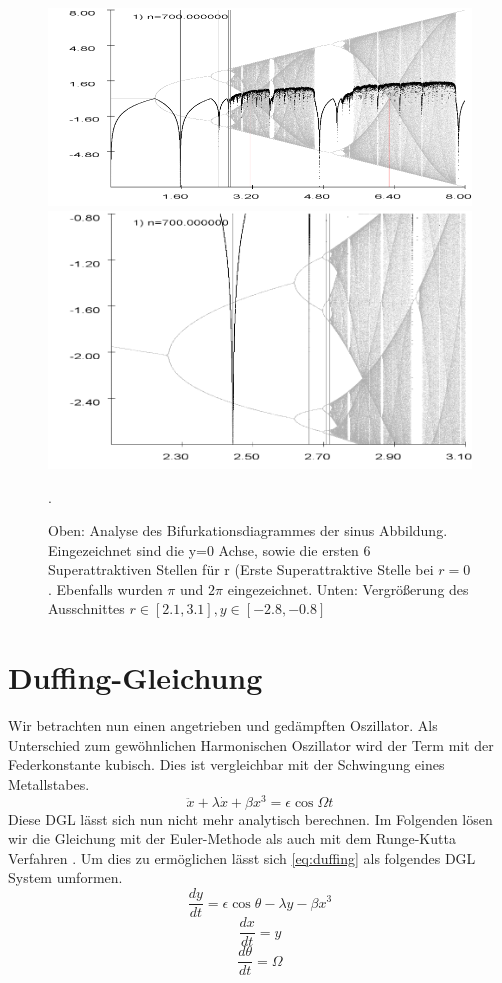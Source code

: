 \documentclass{scrartcl}
\begin{document}
\begin{figure}[!htbp]
\centering
\includegraphics[scale=0.55]{bifurkation-sin}
\includegraphics[scale=0.47]{bifurkation-sin-zoom}
\caption{Oben: Analyse des Bifurkationsdiagrammes der sinus Abbildung. Eingezeichnet sind die y=0 Achse, sowie die ersten 6 Superattraktiven Stellen für r (Erste Superattraktive Stelle bei $r=0$. Ebenfalls wurden $\pi$ und $2\pi$ eingezeichnet. Unten: Vergrößerung des Ausschnittes $r \in [2.1,3.1], y\in[-2.8,-0.8]$}. 
\label{fig:bifurc-sin}
\end{figure}
\newpage
\section { Duffing-Gleichung}
Wir betrachten nun einen angetrieben und gedämpften Oszillator. Als Unterschied zum gewöhnlichen Harmonischen Oszillator wird der Term mit der Federkonstante kubisch. Dies ist vergleichbar mit der Schwingung eines Metallstabes.
\begin{equation}
\ddot{x}+\lambda\dot{x}+\beta x^3=\epsilon\cos{\Omega t}
\label{eq:duffing}
\end{equation} 
Diese DGL lässt sich nun nicht mehr analytisch berechnen.
Im Folgenden lösen wir die Gleichung mit der Euler-Methode \parencite{wiki:euler} als auch mit dem Runge-Kutta Verfahren \parencite{wiki:runge}. Um dies zu ermöglichen lässt sich \eqref{eq:duffing} als folgendes DGL System umformen.
\begin{equation}\frac{dy}{dt}=\epsilon\cos{\theta}-\lambda y - \beta x^3\end{equation}
\begin{equation}\frac{dx}{dt}=y\end{equation}
\begin{equation}\frac{d\theta}{dt}=\Omega\end{equation}
\newline
\end{document}
